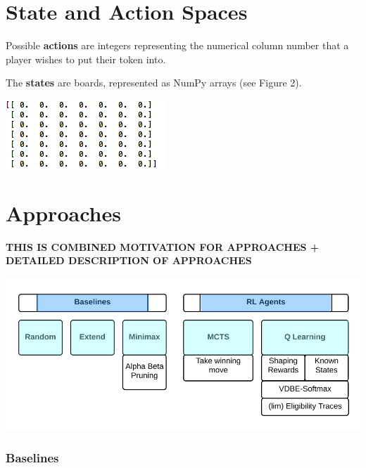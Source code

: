 \documentclass[12pt]{article}
\begin{document}
\section{State and Action Spaces}

Possible \textbf{actions} are integers representing the numerical column number that a player wishes to put their token into.

The \textbf{states} are boards, represented as NumPy arrays (see Figure 2).

\includegraphics[scale=.7]{matrix.png} 

\section{Approaches}
\textbf{THIS IS COMBINED MOTIVATION FOR APPROACHES + DETAILED DESCRIPTION OF APPROACHES}

\includegraphics[scale=.5]{learners.png}

\subsubsection{Baselines} 
\end{document}
